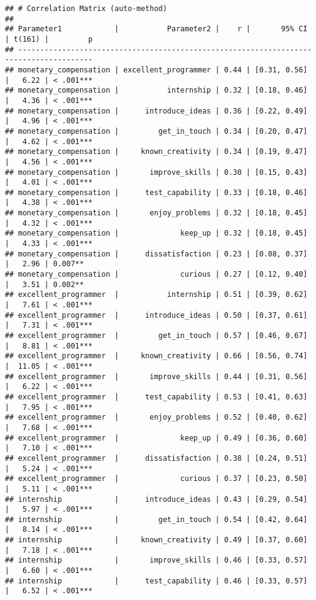 \documentclass[
]{article}
\begin{document}
\begin{verbatim}
## # Correlation Matrix (auto-method)
## 
## Parameter1            |           Parameter2 |    r |       95% CI | t(161) |         p
## ---------------------------------------------------------------------------------------
## monetary_compensation | excellent_programmer | 0.44 | [0.31, 0.56] |   6.22 | < .001***
## monetary_compensation |           internship | 0.32 | [0.18, 0.46] |   4.36 | < .001***
## monetary_compensation |      introduce_ideas | 0.36 | [0.22, 0.49] |   4.96 | < .001***
## monetary_compensation |         get_in_touch | 0.34 | [0.20, 0.47] |   4.62 | < .001***
## monetary_compensation |     known_creativity | 0.34 | [0.19, 0.47] |   4.56 | < .001***
## monetary_compensation |       improve_skills | 0.30 | [0.15, 0.43] |   4.01 | < .001***
## monetary_compensation |      test_capability | 0.33 | [0.18, 0.46] |   4.38 | < .001***
## monetary_compensation |       enjoy_problems | 0.32 | [0.18, 0.45] |   4.32 | < .001***
## monetary_compensation |              keep_up | 0.32 | [0.18, 0.45] |   4.33 | < .001***
## monetary_compensation |      dissatisfaction | 0.23 | [0.08, 0.37] |   2.96 | 0.007**  
## monetary_compensation |              curious | 0.27 | [0.12, 0.40] |   3.51 | 0.002**  
## excellent_programmer  |           internship | 0.51 | [0.39, 0.62] |   7.61 | < .001***
## excellent_programmer  |      introduce_ideas | 0.50 | [0.37, 0.61] |   7.31 | < .001***
## excellent_programmer  |         get_in_touch | 0.57 | [0.46, 0.67] |   8.81 | < .001***
## excellent_programmer  |     known_creativity | 0.66 | [0.56, 0.74] |  11.05 | < .001***
## excellent_programmer  |       improve_skills | 0.44 | [0.31, 0.56] |   6.22 | < .001***
## excellent_programmer  |      test_capability | 0.53 | [0.41, 0.63] |   7.95 | < .001***
## excellent_programmer  |       enjoy_problems | 0.52 | [0.40, 0.62] |   7.68 | < .001***
## excellent_programmer  |              keep_up | 0.49 | [0.36, 0.60] |   7.10 | < .001***
## excellent_programmer  |      dissatisfaction | 0.38 | [0.24, 0.51] |   5.24 | < .001***
## excellent_programmer  |              curious | 0.37 | [0.23, 0.50] |   5.11 | < .001***
## internship            |      introduce_ideas | 0.43 | [0.29, 0.54] |   5.97 | < .001***
## internship            |         get_in_touch | 0.54 | [0.42, 0.64] |   8.14 | < .001***
## internship            |     known_creativity | 0.49 | [0.37, 0.60] |   7.18 | < .001***
## internship            |       improve_skills | 0.46 | [0.33, 0.57] |   6.60 | < .001***
## internship            |      test_capability | 0.46 | [0.33, 0.57] |   6.52 | < .001***

\end{verbatim}
\end{document}
